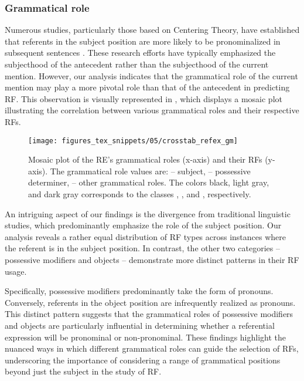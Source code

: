 \subsubsection{Grammatical role}

Numerous studies, particularly those based on Centering Theory, have established that referents in the subject position are more likely to be pronominalized in subsequent sentences \citep{brennan-etal-1987-centering,Brennan1995,kaiser2010effects}. These research efforts have typically emphasized the subjecthood of the antecedent rather than the subjecthood of the current mention. However, our analysis indicates that the grammatical role of the current mention may play a more pivotal role than that of the antecedent in predicting RF. This observation is visually represented in , which displays a mosaic plot illustrating the correlation between various grammatical roles and their respective RFs. 

\begin{figure}
\texttt{[image: figures\_tex\_snippets/05/crosstab\_refex\_gm]}
\caption[Mosaic plot of the RE's grammatical roles (x-axis) and their RFs (y-axis).]{Mosaic plot of the RE's grammatical roles (x-axis) and their RFs (y-axis). The grammatical role values are:  -- subject,  -- possessive determiner,  -- other grammatical roles. The colors black, light gray, and dark gray corresponds to the classes , , and , respectively.}
\label{fig:crosstabrefexgm}
\end{figure}


An intriguing aspect of our findings is the divergence from traditional linguistic studies, which predominantly emphasize the role of the subject position. Our analysis reveals a rather equal distribution of RF types across instances where the referent is in the subject position. In contrast, the other two categories -- possessive modifiers and objects -- demonstrate more distinct patterns in their RF usage.

Specifically, possessive modifiers predominantly take the form of pronouns. Conversely, referents in the object position are infrequently realized as pronouns. This distinct pattern suggests that the grammatical roles of possessive modifiers and objects are particularly influential in determining whether a referential expression will be pronominal or non-pronominal. These findings highlight the nuanced ways in which different grammatical roles can guide the selection of RFs, underscoring the importance of considering a range of grammatical positions beyond just the subject in the study of RF.

